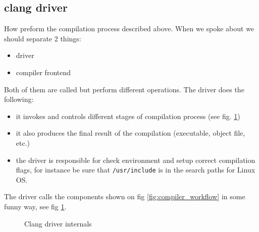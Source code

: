 \subsection{clang driver}
How \clang preform the compilation process described above. When we spoke about
\clang we should separate 2 things: 
\begin{itemize}
\item driver
\item compiler frontend 
\end{itemize}
Both of them are called \clang but perform different
operations. The driver does the following:
\begin{itemize}
  \item it invokes and controls different stages of compilation process (see
    fig. \ref{fig:clang_driver})
  \item it also produces the final result of the compilation (executable,
      object file, etc.)
  \item the driver is responsible for check environment and setup correct
      compilation flags, for instance be sure that
      \texttt{/usr/include} is in the search paths for Linux OS.    
\end{itemize}

The \clang driver calls the components shown on fig \ref{fig:compiler_workflow}
in some funny way, see fig \ref{fig:clang_driver}.
\begin{figure}
  \begin{center}
  \end{center}
  \caption{Clang driver internals}
  \label{fig:clang_driver}
\end{figure}

